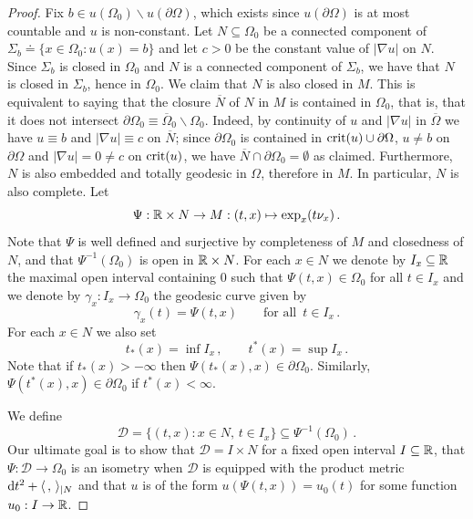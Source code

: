 \documentclass[10 pt,a4paper]{article}
\theoremstyle{definition}
\begin{document}
\begin{proof}
	Fix $b\in u(\Omega_0)\backslash u(\partial\Omega)$, which exists since $u(\partial\Omega)$ is at most countable and $u$ is non-constant. Let $N \subseteq \Omega_0$ be a connected component of $\Sigma_b \doteq \{x\in\Omega_0 : u(x) = b\}$ and let $c>0$ be the constant value of $|\nabla u|$ on $N$. Since $\Sigma_b$ is closed in $\Omega_0$ and $N$ is a connected component of $\Sigma_b$, we have that $N$ is closed in $\Sigma_b$, hence in $\Omega_0$. We claim that $N$ is also closed in $M$. This is equivalent to saying that the closure $\overline{N}$ of $N$ in $M$ is contained in $\Omega_0$, that is, that it does not intersect $\partial\Omega_0\equiv\overline{\Omega}_0\backslash\Omega_0$. Indeed, by continuity of $u$ and $|\nabla u|$ in $\overline{\Omega}$ we have $u\equiv b$ and $|\nabla u|\equiv c$ on $\overline{N}$; since $\partial\Omega_0$ is contained in ${\rm crit}(u) \cup \partial\Omega$, $u\neq b$ on $\partial\Omega$ and $|\nabla u| = 0 \neq c$ on ${\rm crit}(u)$, we have $\overline{N}\cap\partial\Omega_0 = \emptyset$ as claimed. Furthermore, $N$ is also embedded and totally geodesic in $\Omega$, therefore in $M$. In particular, $N$ is also complete. Let
	\[
		\Psi : \mathbb R \times N \to M : (t,x) \mapsto \exp_x(t\nu_x) \, .
	\]
	Note that $\Psi$ is well defined and surjective by completeness of $M$ and closedness of $N$, and that $\Psi^{-1}(\Omega_0)$ is open in $\mathbb R\times N$. For each $x\in N$ we denote by $I_x \subseteq \mathbb R$ the maximal open interval containing $0$ such that $\Psi(t,x) \in \Omega_0$ for all $t\in I_x$ and we denote by $\gamma_x : I_x \to \Omega_0$ the geodesic curve given by
	\[
		\gamma_x(t) = \Psi(t,x) \qquad \text{for all } \, t \in I_x \, .
	\]
	For each $x\in N$ we also set
	\[
		t_\ast(x) = \inf I_x \, , \qquad t^\ast(x) = \sup I_x \, .
	\]
	Note that if $t_\ast(x) > -\infty$ then $\Psi(t_\ast(x),x) \in \partial\Omega_0$. Similarly, $\Psi(t^\ast(x),x) \in \partial\Omega_0$ if $t^\ast(x) < \infty$.
	
	We define
	\[
		\mathscr D = \{ (t,x) : x \in N, \, t \in I_x \} \subseteq \Psi^{-1}(\Omega_0) \, .
	\]
	Our ultimate goal is to show that $\mathscr D = I \times N$ for a fixed open interval $I\subseteq\mathbb R$, that $\Psi : \mathscr D \to \Omega_0$ is an isometry when $\mathscr D$ is equipped with the product metric $\mathrm{d} t^2 + \langle \, , \, \rangle_{|N}$ and that $u$ is of the form $u(\Psi(t,x)) = u_0(t)$ for some function $u_0 : I \to \mathbb R$.
	

\end{proof}
\end{document}
